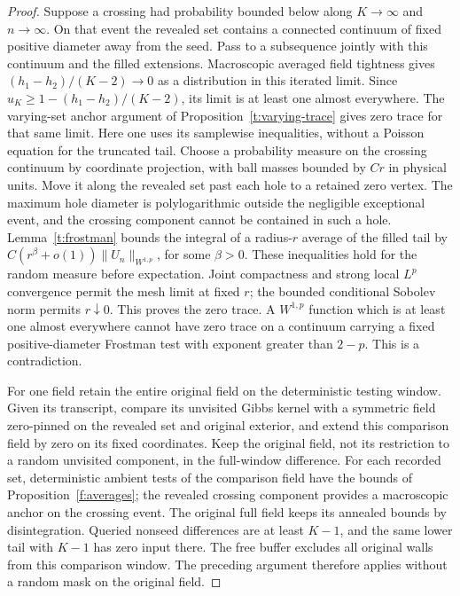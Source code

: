 \begin{proof}
Suppose a crossing had probability bounded below along \(K\to\infty\)
and \(n\to\infty\). On that event the revealed set contains a connected
continuum of fixed positive diameter away from the seed. Pass to a
subsequence jointly with this continuum and the filled extensions.
Macroscopic averaged field tightness gives
\((h_1-h_2)/(K-2)\to0\) as a distribution in this iterated limit.
Since \(u_K\geq1-(h_1-h_2)/(K-2)\), its limit is at least one almost
everywhere. The varying-set anchor argument of
Proposition~\ref{t:varying-trace} gives zero trace for that same limit.
Here one uses its samplewise inequalities, without a Poisson equation
for the truncated tail. Choose a probability measure on the crossing
continuum by coordinate projection, with ball masses bounded by $Cr$
in physical units. Move it along the revealed set past each hole to a
retained zero vertex. The maximum hole diameter is polylogarithmic
outside the negligible exceptional event, and the crossing component
cannot be contained in such a hole. Lemma~\ref{t:frostman} bounds the
integral of a radius-$r$ average of the filled tail by
$C(r^\beta+o(1))\|U_n\|_{W^{1,p}}$, for some $\beta>0$.
These inequalities hold for the random measure before expectation.
Joint compactness and strong local $L^p$ convergence permit the mesh
limit at fixed $r$; the bounded conditional Sobolev norm permits
$r\downarrow0$. This proves the zero trace. A \(W^{1,p}\) function which is
at least one almost everywhere cannot have zero trace on a continuum
carrying a fixed positive-diameter Frostman test with exponent
greater than \(2-p\). This is a contradiction.

For one field retain the entire original field on the deterministic
testing window. Given its transcript, compare its unvisited Gibbs
kernel with a symmetric field zero-pinned on the revealed set and
original exterior, and extend this comparison field by zero on its
fixed coordinates. Keep the original field, not its restriction to
a random unvisited component, in the full-window difference.
For each recorded set, deterministic ambient tests of the comparison
field have the bounds of Proposition~\ref{f:averages}; the revealed
crossing component provides a macroscopic anchor on the crossing
event. The original full field keeps its annealed bounds by
disintegration. Queried nonseed differences are at least \(K-1\),
and the same lower tail with \(K-1\) has zero input there. The
free buffer excludes all original walls from this comparison window.
The preceding argument therefore applies without a random mask
on the original field.
\end{proof}

